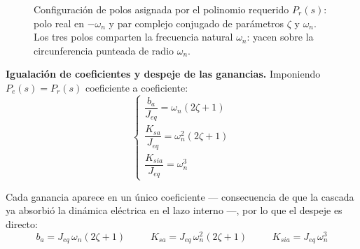 \documentclass[12pt, a4paper,journal, onecolumn, compsoc]{IEEEtran}
\begin{document}
\begin{figure}[H]
    \centering
    \caption{Configuración de polos asignada por el polinomio requerido $P_r(s)$: polo real en $-\omega_n$ y par complejo conjugado de parámetros $\zeta$ y $\omega_n$. Los tres polos comparten la frecuencia natural $\omega_n$: yacen sobre la circunferencia punteada de radio $\omega_n$.}
    \label{fig:polos_pr_522}
\end{figure}

\textbf{Igualación de coeficientes y despeje de las ganancias.} Imponiendo $P_e(s) = P_r(s)$ coeficiente a coeficiente:
\begin{equation}
\begin{cases}
\dfrac{b_a}{J_{eq}} = \omega_n(2\zeta+1) \\[10pt]
\dfrac{K_{sa}}{J_{eq}} = \omega_n^2(2\zeta+1) \\[10pt]
\dfrac{K_{sia}}{J_{eq}} = \omega_n^3
\end{cases}
\label{eq:igualacion_522}
\end{equation}

Cada ganancia aparece en un único coeficiente --- consecuencia de que la cascada ya absorbió la dinámica eléctrica en el lazo interno ---, por lo que el despeje es directo:
\begin{equation}
    \boxed{\;b_a = J_{eq}\,\omega_n(2\zeta+1)\;}\qquad
    \boxed{\;K_{sa} = J_{eq}\,\omega_n^2(2\zeta+1)\;}\qquad
    \boxed{\;K_{sia} = J_{eq}\,\omega_n^3\;}
    \label{eq:ganancias_522}
\end{equation}
\end{document}

